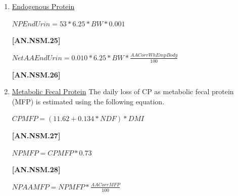 \begin{refsection}
\begin{itemize}
\begin{enumerate}
        \item \underline {Endogenous Protein}
        \vspace{0.2cm}

\begin{center}
    \(NPEndUrin = 53 * 6.25 * BW * 0.001\)
\end{center}

\vspace{0.5cm}
            {\raggedleft \textbf{[AN.NSM.25]}\par}
            \vspace{0.5cm}

        \vspace{0.2cm}

\begin{center}
    \(NetAAEndUrin = 0.010 * 6.25 * BW * \frac{AACorrWhEmpBody}{100}\)
\end{center}

\vspace{0.5cm}
            {\raggedleft \textbf{[AN.NSM.26]}\par}
            \vspace{0.5cm}
            
        \item \underline {Metabolic Fecal Protein}
        The daily loss of CP as metabolic fecal protein (MFP) is estimated using the following equation.
        \vspace{0.2cm}

\begin{center}
    \(CPMFP = (11.62 + 0.134 * NDF) * DMI\)
\end{center}

\vspace{0.5cm}
            {\raggedleft \textbf{[AN.NSM.27]}\par}
            \vspace{0.5cm}

\begin{center}
    \(NPMFP = CPMFP * 0.73\)
\end{center}

\vspace{0.5cm}
            {\raggedleft \textbf{[AN.NSM.28]}\par}
            \vspace{0.5cm}

\begin{center}
    \(NPAAMFP = NPMFP * \frac{AACorrMFP}{100}\)
\end{center}


\end{enumerate}
\end{itemize}
\end{refsection}
